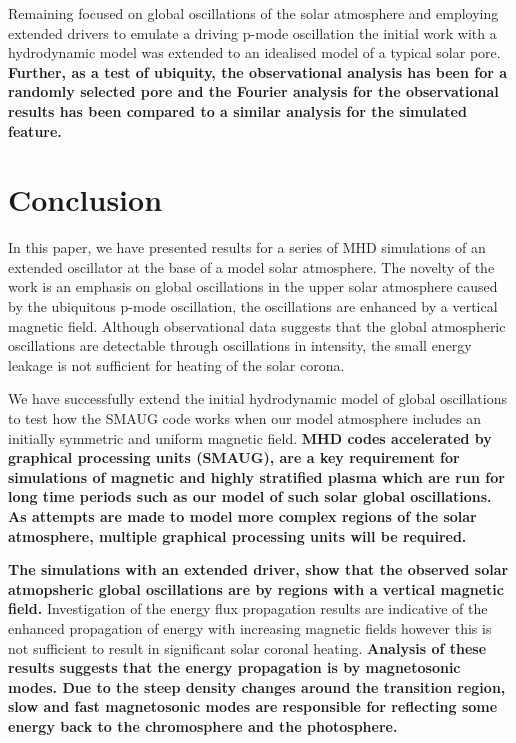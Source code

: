 \documentclass[physics,article,submit,pdftex,moreauthors]{Definitions/mdpi}
\begin{document}
Remaining focused on global oscillations of the solar atmosphere and employing extended drivers to emulate a driving p-mode oscillation the initial work with a hydrodynamic model was extended to an idealised model of a typical solar pore. {\bf Further, as a test of ubiquity, the observational analysis has been for a randomly selected pore and the Fourier analysis for the observational results has been compared to a similar analysis for the simulated feature.}  








\section{Conclusion}

In this paper, we have presented results for a series of MHD simulations of an extended oscillator at the base of a model solar atmosphere.  The novelty of the work is an emphasis on global oscillations in the upper solar atmosphere caused by the ubiquitous p-mode oscillation, the oscillations are enhanced by a vertical magnetic field. Although observational data suggests that the global atmospheric oscillations are detectable through oscillations in intensity, the small energy leakage is not sufficient for heating of the solar corona.

We  have successfully extend the initial hydrodynamic model of global oscillations to test how the SMAUG \cite{Griffiths2015} code works when our model atmosphere includes an initially symmetric and uniform magnetic field. {\bf MHD codes accelerated by graphical processing units (SMAUG), are a key requirement for simulations of magnetic and highly stratified plasma which are run for long time periods such as our model of such solar global oscillations. As attempts are made to model more complex regions of the solar atmosphere, multiple graphical processing units will be required.   }

{\bf The simulations with an extended driver, show that the observed  solar atmopsheric global oscillations are by regions with a vertical magnetic field. } Investigation of the energy flux propagation results are indicative of the enhanced propagation of energy with increasing magnetic fields however this is not sufficient to result in significant solar coronal heating. {\bf Analysis of these results suggests that the energy propagation is by magnetosonic modes. Due to the steep density changes around the transition region, slow and fast magnetosonic modes are responsible for reflecting some energy back to the chromosphere and the photosphere. }  
\end{document}
